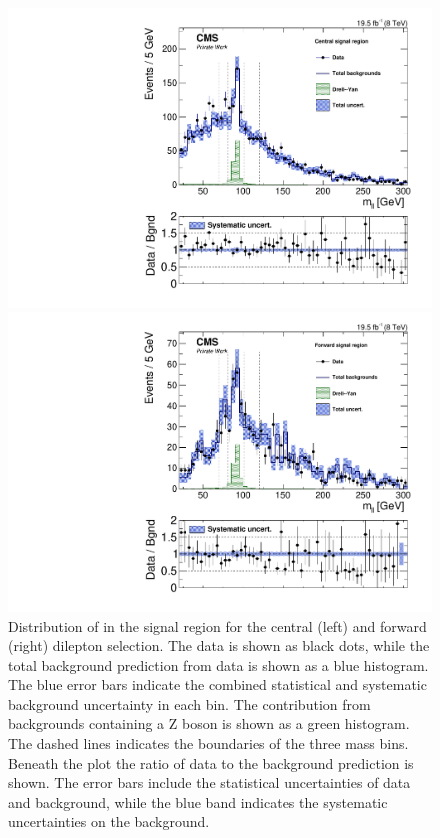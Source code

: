 \begin{figure}[htbp]
\centering
\begin{minipage}[t]{0.49\textwidth}
  \includegraphics[width=\textwidth]{plots/results/mllResult_SignalCentral_Full2012_SF.pdf}
\end{minipage}
\begin{minipage}[t]{0.49\textwidth}
\includegraphics[width=\textwidth]{plots/results/mllResult_SignalForward_Full2012_SF.pdf}
\end{minipage}

\caption{Distribution of \mll in the signal region for the central (left) and forward (right) dilepton selection. The data is shown as black dots, while the total background prediction from data is shown as a blue histogram. The blue error bars indicate the combined statistical and systematic background uncertainty in each bin. The contribution from backgrounds containing a Z boson is shown as a green histogram. The dashed lines indicates the boundaries of the three mass bins. Beneath the plot the ratio of data to the background prediction is shown. The error bars include the statistical uncertainties of data and background, while the blue band indicates the systematic uncertainties on the background. }
\label{fig:resultsCC}
\end{figure} 

